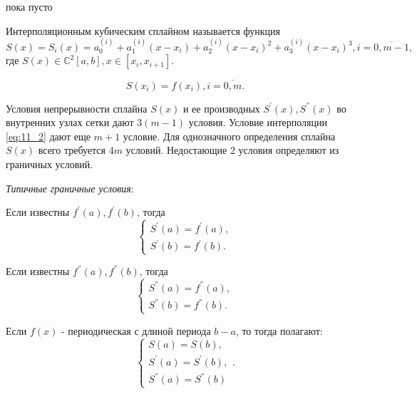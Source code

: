 \begin{col-answer-preambule}
	\begin{plan}
    \item пока пусто
	\end{plan}
\end{col-answer-preambule}


Интерполяционным кубическим сплайном называется функция
\begin{equation*}
  S(x) = S_i (x) = a_0^{(i)} + a_1^{(i)}(x - x_i) + a_2^{(i)}(x-x_i)^2 + a_3^{(i)} (x - x_i)^3, i = \overline{0, m - 1},
\end{equation*}
где $S(x) \in \mathbb{C}^{2} [a, b], x \in [x_i, x_{i + 1}]$.

\begin{equation}\label{eq:11_2}
  S(x_i) = f(x_i), i = \overline{0, m}.
\end{equation}

Условия непрерывности сплайна $S(x)$ и ее производных $S^{'}(x), S^{''}(x)$ во
внутренних узлах сетки дают $3 (m - 1)$ условия. Условие интерполяции \eqref{eq:11_2}
дают еще $m + 1$ условие. Для однозначного определения сплайна $S(x)$ всего требуется $4m$ условий. Недостающие 2 условия определяют из граничных условий.

\textit{Типичные граничные условия}:

Если известны $f^{'}(a), f^{'}(b)$, тогда
\begin{equation*}
  \begin{cases} S^{'}(a) = f^{'}(a), \\ S^{'}(b) = f^{'}(b). \end{cases}
\end{equation*}

Если известны $f^{''}(a), f^{''}(b)$, тогда
\begin{equation*}
  \begin{cases} S^{''}(a) = f^{''}(a), \\ S^{''}(b) = f^{''}(b). \end{cases}
\end{equation*}

Если $f(x)$ - периодическая с длиной периода $b - a$, то тогда полагают:
\begin{equation*}
  \begin{cases} S(a) = S(b), \\ S^{'} (a) = S^{'} (b), \\  S^{''} (a) = S^{''} (b) \end{cases}.
\end{equation*}

